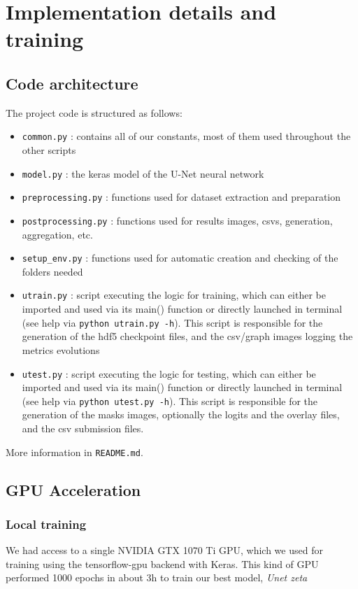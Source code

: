 \documentclass[10pt,conference,compsocconf]{IEEEtran}
\begin{document}
\section{Implementation details and training}

\subsection{Code architecture}

The project code is structured as follows:
\begin{itemize}
\item \verb|common.py| : contains all of our constants, most of them used throughout the other scripts
\item \verb|model.py| : the keras model of the U-Net neural network
\item \verb|preprocessing.py| : functions used for dataset extraction and preparation
\item \verb|postprocessing.py| : functions used for results images, csvs, generation, aggregation, etc.
\item \verb|setup_env.py| : functions used for automatic creation and checking of the folders needed
\item \verb|utrain.py| : script executing the logic for training, which can either be imported and used via its main() function or directly launched in terminal (see help via \verb|python utrain.py -h|). This script is responsible for the generation of the hdf5 checkpoint files, and the csv/graph images logging the metrics evolutions
\item \verb|utest.py| : script executing the logic for testing, which can either be imported and used via its main() function or directly launched in terminal (see help via \verb|python utest.py -h|). This script is responsible for the generation of the masks images, optionally the logits and the overlay files, and the csv submission files.
\end{itemize}
More information in \verb|README.md|.

\subsection{GPU Acceleration}

\subsubsection{Local training}
We had access to a single NVIDIA GTX 1070 Ti GPU, which we used for training using the tensorflow-gpu backend with Keras. This kind of GPU performed 1000 epochs in about 3h to train our best model, \textit{Unet zeta}
\end{document}
